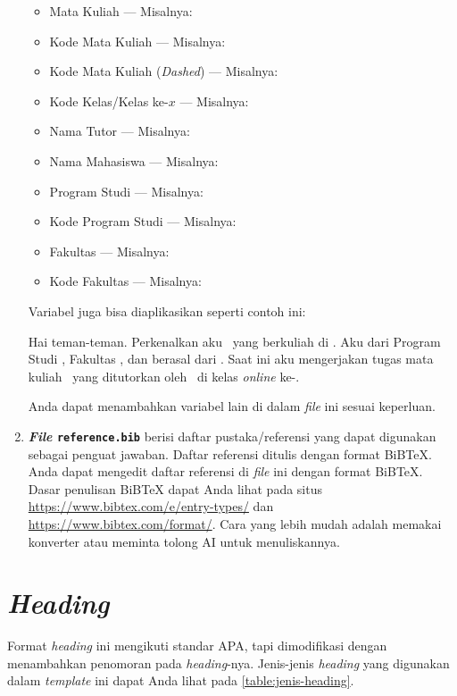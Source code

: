 \begin{enumerate}[]
\begin{itemize}[nosep]
        \item Mata Kuliah --- Misalnya: \namaMataKuliah
        \item Kode Mata Kuliah --- Misalnya: \kodeMataKuliah
        \item Kode Mata Kuliah (\textit{Dashed}) --- Misalnya: \KodeMataKuliah
        \item Kode Kelas/Kelas ke-$x$ --- Misalnya: \kodeKelas
        \item Nama Tutor --- Misalnya: \namaTutorPengampu
        \item Nama Mahasiswa --- Misalnya: \namaMahasiswa
        \item Program Studi --- Misalnya: \programStudi
        \item Kode Program Studi --- Misalnya: \kodeProgramStudi
        \item Fakultas --- Misalnya: \fakultas
        \item Kode Fakultas --- Misalnya: \kodeFakultas
    \end{itemize}
    
    Variabel juga bisa diaplikasikan seperti contoh ini:
    
    Hai teman-teman. Perkenalkan aku \namaMahasiswa\ yang berkuliah di \perguruanTinggi. Aku dari Program Studi \programStudi, Fakultas \fakultas, dan berasal dari \utDaerah. Saat ini aku mengerjakan tugas mata kuliah \namaMataKuliah\ yang ditutorkan oleh \namaTutorPengampu\ di kelas \textit{online} ke-\kodeKelas.
    
    Anda dapat menambahkan variabel lain di dalam \textit{file} ini sesuai keperluan.
    
    \item \textbf{\textit{File} \texttt{reference.bib}} berisi daftar pustaka/referensi yang dapat digunakan sebagai penguat jawaban. Daftar referensi ditulis dengan format BiBTeX. Anda dapat mengedit daftar referensi di \textit{file} ini dengan format BiBTeX. Dasar penulisan BiBTeX dapat Anda lihat pada situs \url{https://www.bibtex.com/e/entry-types/} dan \url{https://www.bibtex.com/format/}. Cara yang lebih mudah adalah memakai konverter atau meminta tolong AI untuk menuliskannya.
\end{enumerate}

\section{\textit{Heading}}

Format \textit{heading} ini mengikuti standar APA, tapi dimodifikasi dengan menambahkan penomoran pada \textit{heading}-nya. Jenis-jenis \textit{heading} yang digunakan dalam \textit{template} ini dapat Anda lihat pada \autoref{table:jenis-heading}.

